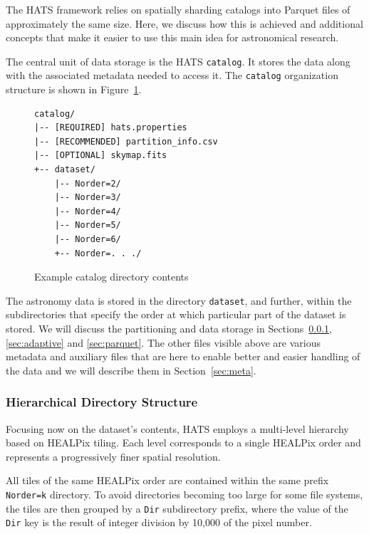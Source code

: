 \documentclass[11pt,a4paper]{ivoa}
\begin{document}
The HATS framework relies on spatially sharding catalogs into Parquet files of approximately the same size. 
Here, we discuss how this is achieved and additional concepts that make it easier to use this main idea for astronomical research.

The central unit of data storage is the HATS \texttt{catalog}. 
It stores the data along with the associated metadata needed to access it. 
The  \texttt{catalog} organization structure is shown in Figure~\ref{fig:exampleCatalogStructure}.

\begin{figure}
\begin{minipage}{\linewidth}
\begin{lstlisting}
catalog/
|-- [REQUIRED] hats.properties
|-- [RECOMMENDED] partition_info.csv
|-- [OPTIONAL] skymap.fits
+-- dataset/
    |-- Norder=2/
    |-- Norder=3/
    |-- Norder=4/
    |-- Norder=5/
    |-- Norder=6/
    +-- Norder=. . ./
\end{lstlisting}
\end{minipage}
\caption{Example catalog directory contents}
\label{fig:exampleCatalogStructure}
\end{figure}

The astronomy data is stored in the directory \texttt{dataset}, and further, within the subdirectories that specify the order at which particular part of the dataset is stored. 
We will discuss the partitioning and data storage in Sections~\ref{sec:hierarchical}, \ref{sec:adaptive} and \ref{sec:parquet}. 
The other files visible above are various metadata and auxiliary files that are here to enable better and easier handling of the data and we will describe them in Section~\ref{sec:meta}. 
    
\subsubsection{Hierarchical Directory Structure} \label{sec:hierarchical}
Focusing now on the dataset's contents, HATS employs a multi-level hierarchy based on HEALPix tiling.
Each level corresponds to a single HEALPix order and represents a progressively finer spatial resolution.

All tiles of the same HEALPix order are contained within the same prefix \texttt{Norder=k} directory. 
To avoid directories becoming too large for some file systems, the tiles are then grouped by a \texttt{Dir} subdirectory prefix,
where the value of the \texttt{Dir} key is the result of integer division by 10,000 of the pixel number.
\end{document}
